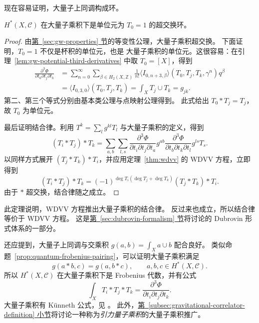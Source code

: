 现在容易证明，大量子上同调构成环。
\begin{theorem}\label{thm:big-quantum-ring}
$H^*(X,\mathcal C)$ 在大量子乘积下是单位元为 $T_0=1$ 的超交换环。
\end{theorem}
\begin{proof}
由\hyperref[sec:gw-properties]{第~\ref*{sec:gw-properties} 节}的等变性公理，大量子乘积超交换。
下面证明，$T_0=1$ 不仅是杯积的单位元，也是
大量子乘积的单位元。这很容易：在引理~\ref{lem:gw-potential-third-derivatives} 中取 $T_0=[X]$，得到
\begin{equation}\label{eq:gw-potential-unit-derivative}
\begin{aligned}
\frac{\partial^3\Phi}{\partial t_0\partial t_j\partial t_k}
&=\sum_{n=0}^{\infty}\sum_{\beta\in H_2(X,\mathbb Z)}
\frac1{n!}\langle I_{0,n+3,\beta}\rangle(T_0,T_j,T_k,\gamma^n)q^\beta\\
&=\langle I_{0,3,0}\rangle(T_0,T_j,T_k)=\int_XT_j\cup T_k=g_{jk}.
\end{aligned}
\end{equation}
第二、第三个等式分别由基本类公理与点映射公理得到。
此式给出 $T_0*T_j=T_j$，故 $T_0$ 为单位元。

最后证明结合律。利用 $T^k=\sum_lg^{kl}T_l$ 与大量子乘积的定义，得到
\[
(T_i*T_j)*T_k=\sum_{a,b}\sum_{l,s}
\frac{\partial^3\Phi}{\partial t_i\partial t_j\partial t_a}g^{ab}
\frac{\partial^3\Phi}{\partial t_b\partial t_k\partial t_l}g^{ls}T_s.
\]
以同样方式展开 $(T_j*T_k)*T_i$，并应用定理~\ref{thm:wdvv} 的 WDVV 方程，立即得到
\[
(T_i*T_j)*T_k=(-1)^{\deg T_i(\deg T_j+\deg T_k)}(T_j*T_k)*T_i.
\]
由于 $*$ 超交换，结合律随之成立。
\end{proof}
此定理说明，WDVV 方程推出大量子乘积的结合律。
反过来也成立，所以结合律等价于 WDVV 方程。
这是\hyperref[sec:dubrovin-formalism]{第~\ref*{sec:dubrovin-formalism} 节}将讨论的 Dubrovin 形式体系的一部分。

还应提到，大量子上同调与交乘积 $g(a,b)=\int_Xa\cup b$ 配合良好。
类似命题~\ref{prop:quantum-frobenius-pairing}，可以证明大量子乘积满足
\begin{equation}\label{eq:big-quantum-frobenius}
g(a*b,c)=g(a,b*c),\qquad a,b,c\in H^*(X,\mathcal C).
\end{equation}
所以 $H^*(X,\mathcal C)$ 在大量子乘积下是 Frobenius 代数，并有公式
\[
\int_XT_i*T_j*T_k=\frac{\partial^3\Phi}{\partial t_i\partial t_j\partial t_k}.
\]
大量子乘积有 Künneth 公式，见 。
此外，\hyperref[subsec:gravitational-correlator-definition]{第~\ref*{subsec:gravitational-correlator-definition} 小节}将讨论一种称为\emph{引力量子乘积}的大量子乘积推广。

